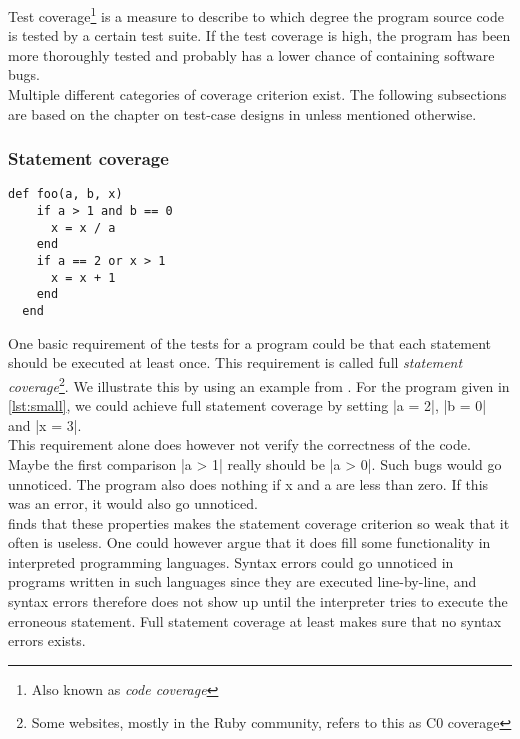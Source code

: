 \MakeShortVerb{\|}

\label{sec:theory_coverage}
Test coverage\footnote{Also known as \emph{code coverage}} is a measure
to describe to which degree the program source code is tested by a
certain test suite. If the test coverage is high, the program has been
more thoroughly tested and probably has a lower chance of containing
software bugs.\cite{wiki:coverage}\\

Multiple different categories of coverage criterion exist. The
following subsections are based on the chapter on test-case designs in
\citet{book:art_of_testing} unless mentioned otherwise.\\


\subsubsection{Statement coverage}
\label{sec:theory_statement_coverage}
\begin{lstlisting}[caption=A small example program for explaining different test coverage concepts.,
                   label=lst:small, float=t]
  def foo(a, b, x)
    if a > 1 and b == 0
      x = x / a
    end
    if a == 2 or x > 1
      x = x + 1
    end
  end
\end{lstlisting}

One basic requirement of the tests for a program could be that each
statement should be executed at least once. This requirement is called
full \emph{statement coverage}\footnote{Some websites, mostly in the
Ruby community, refers to this as C0 coverage}. We illustrate this by
using an example from \citet{book:art_of_testing}. For the program given
in \ref{lst:small}, we could achieve full statement coverage by setting
|a = 2|, |b = 0| and |x = 3|.\\

This requirement alone does however not verify the correctness of the
code. Maybe the first comparison |a > 1| really should be |a > 0|. Such
bugs would go unnoticed. The program also does nothing if x and a are
less than zero. If this was an error, it would also go unnoticed.\\

\citeauthor{book:art_of_testing} finds that these properties makes the
statement coverage criterion so weak that it often is useless. One could
however argue that it does fill some functionality in interpreted
programming languages. Syntax errors could go unnoticed in programs
written in such languages since they are executed line-by-line, and
syntax errors therefore does not show up until the interpreter tries to
execute the erroneous statement. Full statement coverage at least makes
sure that no syntax errors exists.\\


